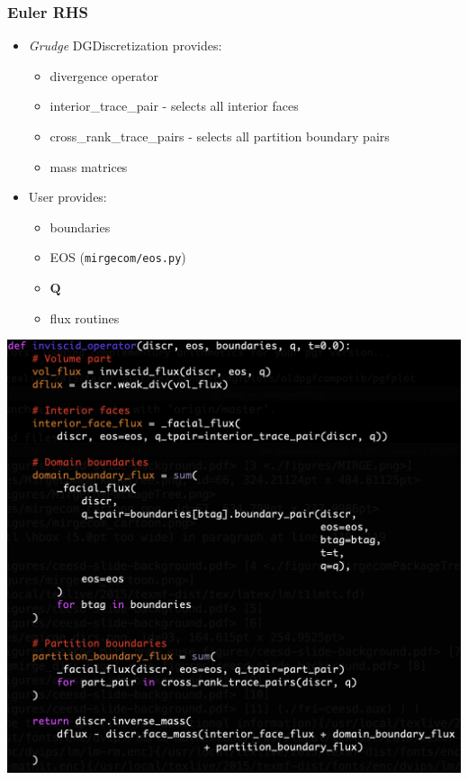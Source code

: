 \begin{frame}\frametitle{Euler RHS}
\begin{multicols}{2}
\begin{itemize}
  \item \textit{Grudge} DGDiscretization provides:
  \begin{itemize}
    \item divergence operator
    \item interior\_trace\_pair - selects all interior faces
    \item cross\_rank\_trace\_pairs - selects all partition boundary pairs
    \item mass matrices
  \end{itemize}
  \item User provides:
  \begin{itemize}
    \item boundaries
    \item EOS (\texttt{mirgecom/eos.py})
    \item $\mathbf{Q}$
    \item flux routines
  \end{itemize}
\end{itemize}
\columnbreak
\hspace{-.2in}
\includegraphics[width=.6\textwidth]{figures/inviscid_operator.png}
\end{multicols}
\end{frame}

